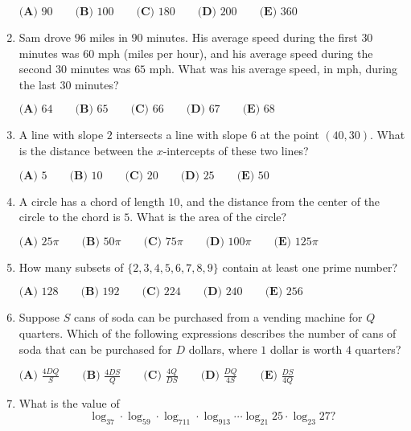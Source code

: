 \documentclass{article}
\begin{document}
\begin{enumerate}[label=\arabic*., itemsep=0.5em]
$\textbf{(A) } 90 \qquad \textbf{(B) } 100 \qquad \textbf{(C) } 180 \qquad \textbf{(D) } 200 \qquad \textbf{(E) } 360$\par \vspace{0.5em}\item Sam drove $96$ miles in $90$ minutes. His average speed during the first $30$ minutes was $60$ mph (miles per hour), and his average speed during the second $30$ minutes was $65$ mph. What was his average speed, in mph, during the last $30$ minutes?

$
\textbf{(A) } 64 \qquad
\textbf{(B) } 65 \qquad
\textbf{(C) } 66 \qquad
\textbf{(D) } 67 \qquad
\textbf{(E) } 68
$\par \vspace{0.5em}\item A line with slope $2$ intersects a line with slope $6$ at the point $(40,30)$. What is the distance between the $x$-intercepts of these two lines? 

$\textbf{(A) } 5 \qquad \textbf{(B) } 10 \qquad \textbf{(C) } 20 \qquad \textbf{(D) } 25 \qquad \textbf{(E) } 50$\par \vspace{0.5em}\item A circle has a chord of length $10$, and the distance from the center of the circle to the chord is $5$. What is the area of the circle?

$
\textbf{(A) }25\pi \qquad
\textbf{(B) }50\pi \qquad
\textbf{(C) }75\pi \qquad
\textbf{(D) }100\pi \qquad
\textbf{(E) }125\pi \qquad
$\par \vspace{0.5em}\item How many subsets of $\{2,3,4,5,6,7,8,9\}$ contain at least one prime number?

$
\textbf{(A) } 128 \qquad
\textbf{(B) } 192 \qquad
\textbf{(C) } 224 \qquad
\textbf{(D) } 240 \qquad
\textbf{(E) } 256
$\par \vspace{0.5em}\item Suppose $S$ cans of soda can be purchased from a vending machine for $Q$ quarters. Which of the following expressions describes the number of cans of soda that can be purchased for $D$ dollars, where $1$ dollar is worth $4$ quarters?

$\textbf{(A) } \frac{4DQ}{S} \qquad \textbf{(B) } \frac{4DS}{Q} \qquad \textbf{(C) } \frac{4Q}{DS} \qquad \textbf{(D) } \frac{DQ}{4S} \qquad \textbf{(E) } \frac{DS}{4Q}$\par \vspace{0.5em}\item What is the value of 
\begin{equation*}
\log_37\cdot\log_59\cdot\log_711\cdot\log_913\cdots\log_{21}25\cdot\log_{23}27?
\end{equation*}


\end{enumerate}
\end{document}
